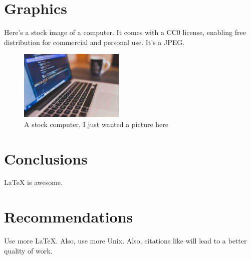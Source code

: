 \documentclass{workreport}
\begin{document}
\begin{body}
\section{Graphics}

	Here's a stock image of a computer. It comes with a CC0 license, enabling
	free distribution for commercial and personal use. It's a JPEG.

	\begin{figure}[!ht]
		\centering
		\label{fig:stock_computer}
		\includegraphics[width=5cm]{./images/stock-image.jpg}
		\caption{A stock computer, I just wanted a picture here}
	\end{figure}

\section{Conclusions}

	\gls{LaTeX} is awesome.

\section{Recommendations}

	Use more \LaTeX. Also, use more \gls{Unix}. Also, citations like
    	\cite{k_townsend_ble} will lead to a better quality of work.

\end{body}



\end{document}
